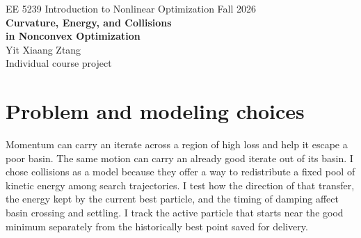 \documentclass[10pt,letterpaper]{article}
\begin{document}
\begin{center}
{\small EE 5239 \quad Introduction to Nonlinear Optimization \quad Fall 2026}\\[9pt]
{\LARGE\bfseries Curvature, Energy, and Collisions\\[3pt] in Nonconvex Optimization}\\[8pt]
{\large Yit Xiaang Ztang}\\
Individual course project
\end{center}

\begin{abstract}
This project asks when redistributing momentum helps a search cross a barrier and when it disturbs a good solution. Early trials showed that reflecting uphill steps could prevent escape. In a held-out double-well comparison, collision search with a settling phase finished at the target in \(14/20\) runs, compared with \(0/20\) for four-start Momentum and \(16/20\) for conservation-matched random scattering. In a separate test, lowering bounce height and transferring horizontal momentum protected an already good particle. For a vertical orbit above a quadratic minimum, I prove that the undamped linearized return is bounded exactly when \(0<\kappa H<1/2\), where \(\kappa\) is wall curvature and \(H\) is bounce height. On NanoGPT, conservative velocity exchange lowered the first post-exchange training loss on average, but raised mean final test loss by \(0.01879\) relative to independent Momentum SGD replicas. AdamW had the lowest test loss in all ten seed groups.
\end{abstract}

\section{Problem and modeling choices}

Momentum can carry an iterate across a region of high loss and help it escape a poor basin. The same motion can carry an already good iterate out of its basin. I chose collisions as a model because they offer a way to redistribute a fixed pool of kinetic energy among search trajectories. I test how the direction of that transfer, the energy kept by the current best particle, and the timing of damping affect basin crossing and settling. I track the active particle that starts near the good minimum separately from the historically best point saved for delivery.
\end{document}
